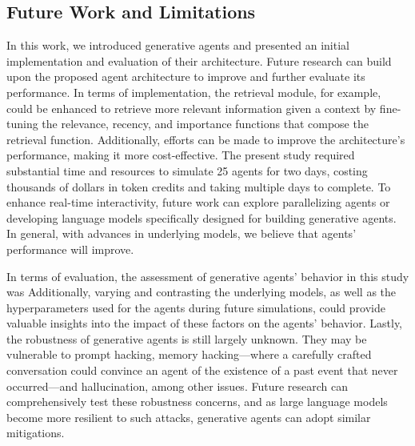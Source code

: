 \subsection{Future Work and Limitations}
In this work, we introduced generative agents and presented an initial implementation and evaluation of their architecture. Future research can build upon the proposed agent architecture to improve and further evaluate its performance. In terms of implementation, the retrieval module, for example, could be enhanced to retrieve more relevant information given a context by fine-tuning the relevance, recency, and importance functions that compose the retrieval function. Additionally, efforts can be made to improve the architecture's performance, making it more cost-effective. The present study required substantial time and resources to simulate 25 agents for two days, costing thousands of dollars in token credits and taking multiple days to complete. To enhance real-time interactivity, future work can explore parallelizing agents or developing language models specifically designed for building generative agents. In general, with advances in underlying models, we believe that agents' performance will improve.

In terms of evaluation, the assessment of generative agents' behavior in this study was  Additionally, varying and contrasting the underlying models, as well as the hyperparameters used for the agents during future simulations, could provide valuable insights into the impact of these factors on the agents' behavior. Lastly, the robustness of generative agents is still largely unknown. They may be vulnerable to prompt hacking, memory hacking---where a carefully crafted conversation could convince an agent of the existence of a past event that never occurred---and hallucination, among other issues. Future research can comprehensively test these robustness concerns, and as large language models become more resilient to such attacks, generative agents can adopt similar mitigations.

